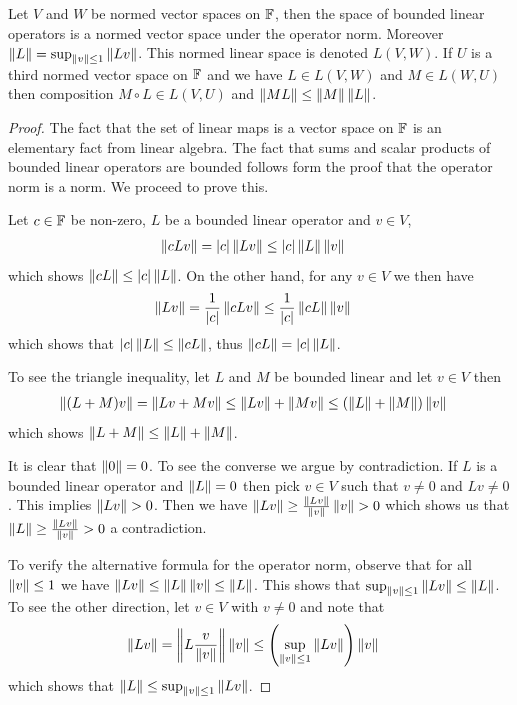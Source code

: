 \begin{prop}\label{banach:OperatorNorm} Let $V$ and $W$ be normed vector spaces on $\field$, then
 the space of bounded linear operators is a normed vector space under
  the operator norm.   Moreover $\norm{L} = \sup_{\norm{v} \leq 1}
  \norm{Lv}$.   This normed linear space is denoted $L(V,W)$.   If $U$
  is a third normed vector space on $\field$ and we have $L \in
  L(V,W)$ and $M \in L(W, U)$ then composition $M \circ L \in L(V, U)$ and
  $\norm{M L} \leq \norm{M}\norm{L}$.
\end{prop}
\begin{proof}
  The fact that the set of linear maps is a vector space on $\field$
  is an elementary fact from linear algebra.   The fact that sums and
  scalar products of bounded linear operators are bounded follows form
  the proof that the operator norm is a norm.  We proceed to prove this.

  Let $c \in \field$ be non-zero, $L$ be a bounded linear operator and $v \in V$,
  \begin{align*}
  \norm{cL v} &= \abs{c} \norm{Lv} \leq \abs{c} \norm{L} \norm{v}
  \end{align*}
  which shows $\norm{cL} \leq \abs{c} \norm{L}$.   On the other hand,
for any $v \in V$ we then have
  \begin{align*}
 \norm{Lv} &=\frac{1}{\abs{c} } \norm{cLv} \leq  \frac{1}{\abs{c} } \norm{cL} \norm{v}
  \end{align*}
  which shows that $\abs{c} \norm{L} \leq \norm{cL}$, thus $\norm{cL}
  = \abs{c} \norm{L}$.

To see the triangle inequality, let $L$ and $M$ be bounded linear and
let $v \in V$ then
\begin{align*}
  \norm{(L+M)v} &= \norm {Lv + Mv} \leq \norm{Lv} + \norm{M v} \leq
                  (\norm{L} + \norm{M}) \norm{v}
\end{align*}
which shows $\norm{L+M} \leq \norm{L} + \norm{M}$.

It is clear that $\norm{0} = 0$.  To see the converse we argue by
contradiction.  If $L$ is a bounded linear operator
and $\norm{L} = 0$ then pick $v \in V$ such that $v \neq 0$ and $Lv \neq 0$.  This
implies $\norm{Lv} > 0$.   Then we have $\norm{Lv} \geq
\frac{\norm{Lv}}{\norm{v}} \norm{v} > 0$ which shows us that
$\norm{L} \geq \frac{\norm{Lv}}{\norm{v}} >0$ a contradiction.

To verify the alternative formula for the operator norm, observe that
for all $\norm{v} \leq 1$ we have $\norm{Lv} \leq \norm{L} \norm{v}
\leq \norm{L}$.  This shows that $\sup_{\norm{v} \leq 1}  \norm{Lv}
\leq \norm{L}$.  To see the other direction, let $v \in V$ with $v
\neq 0$ and note that
\begin{align*}
  \norm{Lv} &= \norm{ L \frac{v}{\norm{v}}} \norm{v} \leq \left(
              \sup_{\norm{v} \leq 1} \norm{Lv} \right) \norm{v}
\end{align*}
which shows that $\norm{L} \leq   \sup_{\norm{v} \leq 1} \norm{Lv}$.


\end{proof}
